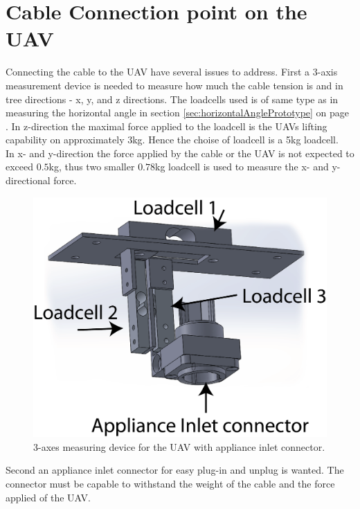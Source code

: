 \section{Cable Connection point on the UAV}
Connecting the cable to the UAV have several issues to address. First a 3-axis measurement device is needed to measure how much the cable tension is and in tree directions - x, y, and z directions. The loadcells used is of same type as in measuring the horizontal angle in section \ref{sec:horizontalAnglePrototype} on page \pageref{sec:horizontalAnglePrototype}. In z-direction the maximal force applied to the loadcell is the UAVs lifting capability on approximately 3kg. Hence the choise of loadcell is a 5kg loadcell.\\
\noindent
In x- and y-direction the force applied by the cable or the UAV is not expected to exceed $0.5$kg, thus two smaller $0.78$kg loadcell is used to measure the x- and y-directional force. 

\begin{figure}[hbtp]
\centering
\includegraphics[scale=0.5]{graphics/cad/hexa.png}
\caption{3-axes measuring device for the UAV with appliance inlet connector.}
\end{figure}


\noindent
Second an appliance inlet connector for easy plug-in and unplug is wanted. The connector must be capable to withstand the weight of the cable and the force applied of the UAV. 

